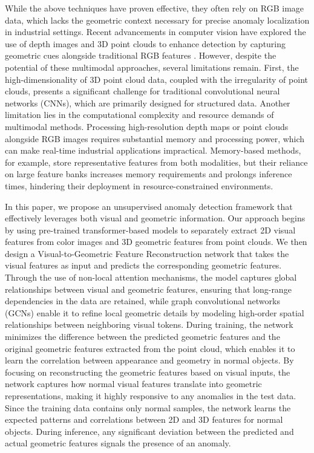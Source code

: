 While the above techniques have proven effective, they often rely on RGB image data, which lacks the geometric context necessary for precise anomaly localization in industrial settings. Recent advancements in computer vision have explored the use of depth images and 3D point clouds to enhance detection by capturing geometric cues alongside traditional RGB features \cite{bergmann2023anomaly, rudolph2023asymmetric, horwitz2023back, wang2023multimodal}. However, despite the potential of these multimodal approaches, several limitations remain. First, the high-dimensionality of 3D point cloud data, coupled with the irregularity of point clouds, presents a significant challenge for traditional convolutional neural networks (CNNs), which are primarily designed for structured data. Another limitation lies in the computational complexity and resource demands of multimodal methods. Processing high-resolution depth maps or point clouds alongside RGB images requires substantial memory and processing power, which can make real-time industrial applications impractical. Memory-based methods, for example, store representative features from both modalities, but their reliance on large feature banks increases memory requirements and prolongs inference times, hindering their deployment in resource-constrained environments.

In this paper,  we propose an unsupervised anomaly detection framework that effectively leverages both visual and geometric information. Our approach begins by using pre-trained transformer-based models to separately extract 2D visual features from color images and 3D geometric features from point clouds. We then design a Visual-to-Geometric Feature Reconstruction network that takes the visual features as input and predicts the corresponding geometric features. Through the use of non-local attention mechanisms, the model captures global relationships between visual and geometric features, ensuring that long-range dependencies in the data are retained, while graph convolutional networks (GCNs) enable it to refine local geometric details by modeling high-order spatial relationships between neighboring visual tokens. During training, the network minimizes the difference between the predicted geometric features and the original geometric features extracted from the point cloud, which enables it to learn the correlation between appearance and geometry in normal objects. By focusing on reconstructing the geometric features based on visual inputs, the network captures how normal visual features translate into geometric representations, making it highly responsive to any anomalies in the test data. Since the training data contains only normal samples, the network learns the expected patterns and correlations between 2D and 3D features for normal objects. During inference, any significant deviation between the predicted and actual geometric features signals the presence of an anomaly.

